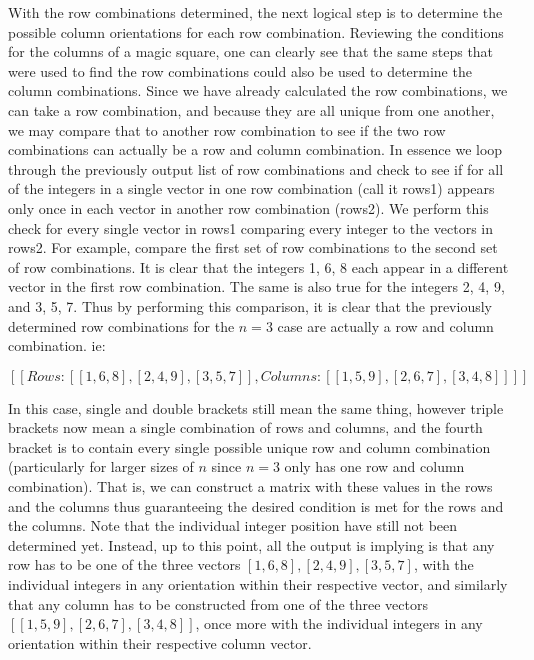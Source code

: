 \documentclass{article}
\begin{document}
    With the row combinations determined, the next logical step is to determine the possible column orientations for each row combination. Reviewing the conditions for the columns of a magic square, one can clearly see that the same steps that were used to find the row combinations could also be used to determine the column combinations. Since we have already calculated the row combinations, we can take a row combination, and because they are all unique from one another, we may compare that to another row combination to see if the two row combinations can actually be a row and column combination. In essence we loop through the previously output list of row combinations and check to see if for all of the integers in a single vector in one row combination (call it rows1) appears only once in each vector in another row combination (rows2). We perform this check for every single vector in rows1 comparing every integer to the vectors in rows2. For example, compare the first set of row combinations to the second set of row combinations. It is clear that the integers 1, 6, 8 each appear in a different vector in the first row combination. The same is also true for the integers 2, 4, 9, and 3, 5, 7. Thus by performing this comparison, it is clear that the previously determined row combinations for the $n = 3$ case are actually a row and column combination. ie:
    \begin{center}
        $[[Rows: [[1, 6, 8], [2, 4, 9], [3, 5, 7]], Columns: [[1, 5, 9], [2, 6, 7], [3, 4, 8]]]]$
    \end{center}
    In this case, single and double brackets still mean the same thing, however triple brackets now mean a single combination of rows and columns, and the fourth bracket is to contain every single possible unique row and column combination (particularly for larger sizes of $n$ since $n = 3$ only has one row and column combination). That is, we can construct a matrix with these values in the rows and the columns thus guaranteeing the desired condition is met for the rows and the columns. Note that the individual integer position have still not been determined yet. Instead, up to this point, all the output is implying is that any row has to be one of the three vectors $[1, 6, 8], [2, 4, 9], [3, 5, 7]$, with the individual integers in any orientation within their respective vector, and similarly that any column has to be constructed from one of the three vectors $[[1, 5, 9], [2, 6, 7], [3, 4, 8]]$, once more with the individual integers in any orientation within their respective column vector.
    
\end{document}
